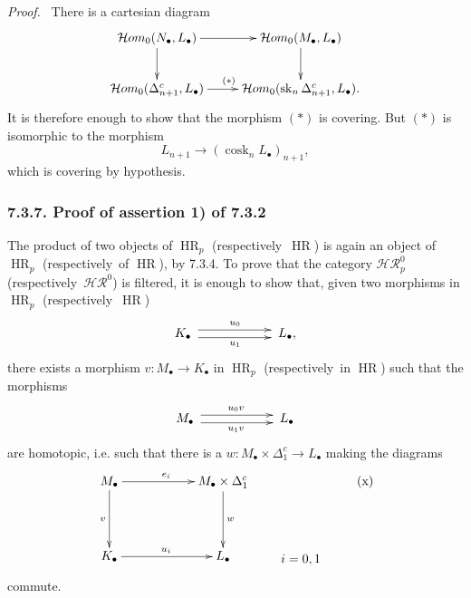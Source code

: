 \documentclass[11pt]{article}
\newcommand{\Hhom}{\mathcal{H}om}
\newcommand{\sk}{\operatorname{sk}}
\newcommand{\cosk}{\operatorname{cosk}}
\newcommand{\HR}{\operatorname{HR}}
\newcommand{\resp}{respectively}
\newcommand{\sheaf}[1]{\mathcal{#1}}
\newenvironment{prooftext}{\par\noindent\emph{Proof.}\ }{\par\medskip}
\begin{document}
\begin{prooftext}
There is a cartesian diagram
\[
\xymatrix{
\Hhom_0(N_\bullet,L_\bullet)\ar[d]\ar[r]&\Hhom_0(M_\bullet,L_\bullet)\ar[d]\\
\Hhom_0(\Delta_{n+1}^c,L_\bullet)\ar[r]^{(*)}&\Hhom_0(\sk_n\Delta_{n+1}^c,L_\bullet).
}
\]
It is therefore enough to show that the morphism $(*)$ is covering. But $(*)$ is isomorphic to the morphism
\[
        L_{n+1}\to (\cosk_nL_\bullet)_{n+1},
\]
which is covering by hypothesis.
\end{prooftext}

\subsubsection*{7.3.7. Proof of assertion 1) of 7.3.2}
The product of two objects of $\HR_p$ (\resp\ $\HR$) is again an object of $\HR_p$ (\resp\ of $\HR$), by 7.3.4. To prove that the category $\sheaf{HR}_p^0$ (\resp\ $\sheaf{HR}^0$) is filtered, it is enough to show that, given two morphisms in $\HR_p$ (\resp\ $\HR$)
\[
\xymatrix@C=2cm@M=.2cm{
K_\bullet\ar@<3pt>[r]^{u_0}\ar@<-3pt>[r]_{u_1}&L_\bullet,
}
\]
there exists a morphism $v:M_\bullet\to K_\bullet$ in $\HR_p$ (\resp\ in $\HR$) such that the morphisms
\[
\xymatrix@C=2cm@M=.2cm{
M_\bullet\ar@<3pt>[r]^{u_0v}\ar@<-3pt>[r]_{u_1v}&L_\bullet
}
\]
are homotopic, i.e. such that there is a $w:M_\bullet\times\Delta_1^c\to L_\bullet$ making the diagrams
\[
\xymatrix@C=2cm@R=1.5cm{
M_\bullet\ar[d]_v\ar[r]^{e_i}&M_\bullet\times\Delta_1^c\ar[d]^w\\
K_\bullet\ar[r]^{u_i}&L_\bullet&\kern-1.5cm\txt{$i=0,1$}
}
\tag{x}
\]
commute.
\end{document}
